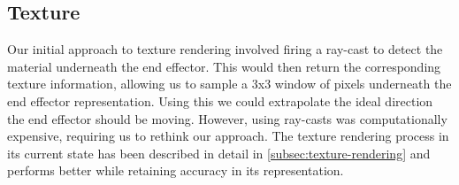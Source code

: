 \subsection{Texture}
Our initial approach to texture rendering involved firing a ray-cast to detect the material underneath the end effector. This would then return the corresponding texture information, allowing us to sample a 3x3 window of pixels underneath the end effector representation. Using this we could extrapolate the ideal direction the end effector should be moving. However, using ray-casts was computationally expensive, requiring us to rethink our approach. The texture rendering process in its current state has been described in detail in \autoref{subsec:texture-rendering} and performs better while retaining accuracy in its representation.
